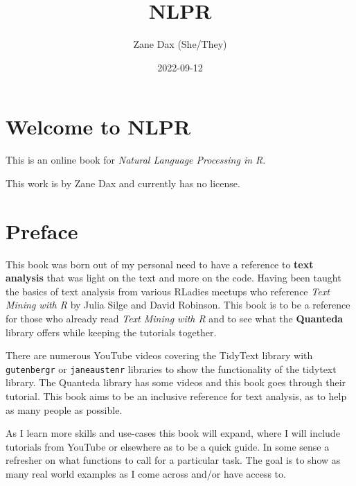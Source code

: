\documentclass[
  letterpaper,
  DIV=11,
  numbers=noendperiod]{scrreprt}
\title{NLPR}
\author{Zane Dax (She/They)}
\date{2022-09-12}
\renewcommand*\contentsname{Table of contents}
\newcommand\contentsname{Table of contents}
\begin{document}
\maketitle
\ifdefined\Shaded\renewenvironment{Shaded}{\begin{tcolorbox}[boxrule=0pt, breakable, borderline west={3pt}{0pt}{shadecolor}, enhanced, frame hidden, interior hidden, sharp corners]}{\end{tcolorbox}}\fi

\renewcommand*\contentsname{Table of contents}
{
\hypersetup{linkcolor=}
\setcounter{tocdepth}{2}
\tableofcontents
}

\hypertarget{welcome-to-nlpr}{%
\chapter*{Welcome to NLPR}\label{welcome-to-nlpr}}

This is an online book for \emph{Natural Language Processing in R}.

This work is by Zane Dax and currently has no license.


\hypertarget{preface}{%
\chapter*{Preface}\label{preface}}

This book was born out of my personal need to have a reference to
\textbf{text analysis} that was light on the text and more on the code.
Having been taught the basics of text analysis from various RLadies
meetups who reference \emph{Text Mining with R} by Julia Silge and David
Robinson. This book is to be a reference for those who already read
\emph{Text Mining with R} and to see what the \textbf{Quanteda} library
offers while keeping the tutorials together.

There are numerous YouTube videos covering the TidyText library with
\texttt{gutenbergr} or \texttt{janeaustenr} libraries to show the
functionality of the tidytext library. The Quanteda library has some
videos and this book goes through their tutorial. This book aims to be
an inclusive reference for text analysis, as to help as many people as
possible.

As I learn more skills and use-cases this book will expand, where I will
include tutorials from YouTube or elsewhere as to be a quick guide. In
some sense a refresher on what functions to call for a particular task.
The goal is to show as many real world examples as I come across and/or
have access to.
\end{document}
